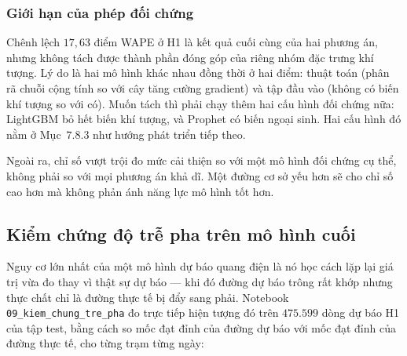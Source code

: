 \subsubsection{Giới hạn của phép đối chứng}

Chênh lệch $17{,}63$ điểm WAPE ở H1 là kết quả cuối cùng của hai phương án, nhưng
không tách được thành phần đóng góp của riêng nhóm đặc trưng khí tượng. Lý do là hai
mô hình khác nhau đồng thời ở hai điểm: thuật toán (phân rã chuỗi cộng tính so với cây
tăng cường gradient) và tập đầu vào (không có biến khí tượng so với có). Muốn tách thì phải
chạy thêm hai cấu hình đối chứng nữa: LightGBM bỏ hết biến khí tượng, và Prophet có biến ngoại
sinh. Hai cấu hình đó nằm ở Mục~$7.8.3$ như hướng phát triển tiếp theo.

Ngoài ra, chỉ số vượt trội đo mức cải thiện so với một mô hình đối chứng cụ thể, không
phải so với mọi phương án khả dĩ. Một đường cơ sở yếu hơn sẽ cho chỉ số cao hơn mà không phản
ánh năng lực mô hình tốt hơn.

\FloatBarrier
\subsection{Kiểm chứng độ trễ pha trên mô hình cuối}

Nguy cơ lớn nhất của một mô hình dự báo quang điện là nó học cách lặp lại giá trị vừa đo thay
vì thật sự dự báo --- khi đó đường dự báo trông rất khớp nhưng thực chất chỉ là đường thực tế
bị đẩy sang phải. Notebook \texttt{09\_kiem\_chung\_tre\_pha} đo trực tiếp hiện tượng đó trên
$475.599$ dòng dự báo H1 của tập test, bằng cách so mốc đạt đỉnh của đường dự báo với mốc đạt
đỉnh của đường thực tế, cho từng trạm từng ngày:

